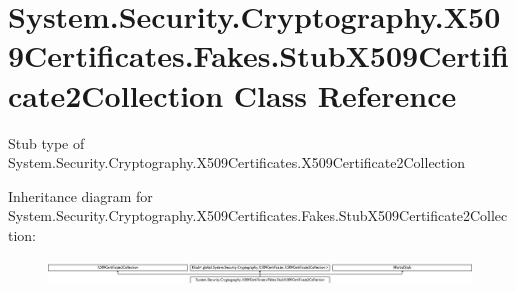 \hypertarget{class_system_1_1_security_1_1_cryptography_1_1_x509_certificates_1_1_fakes_1_1_stub_x509_certificate2_collection}{\section{System.\-Security.\-Cryptography.\-X509\-Certificates.\-Fakes.\-Stub\-X509\-Certificate2\-Collection Class Reference}
\label{class_system_1_1_security_1_1_cryptography_1_1_x509_certificates_1_1_fakes_1_1_stub_x509_certificate2_collection}
}


Stub type of System.\-Security.\-Cryptography.\-X509\-Certificates.\-X509\-Certificate2\-Collection 


Inheritance diagram for System.\-Security.\-Cryptography.\-X509\-Certificates.\-Fakes.\-Stub\-X509\-Certificate2\-Collection\-:\begin{figure}[H]
\begin{center}
\leavevmode
\includegraphics[height=0.696517cm]{class_system_1_1_security_1_1_cryptography_1_1_x509_certificates_1_1_fakes_1_1_stub_x509_certificate2_collection}
\end{center}
\end{figure}
